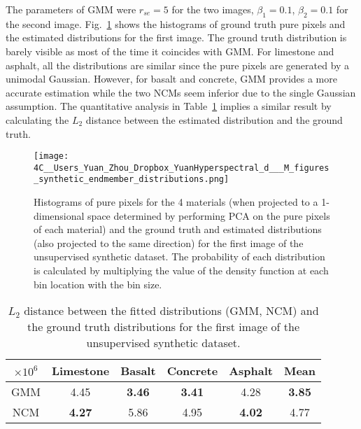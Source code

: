 \documentclass[twocolumn,english]{IEEEtran}
\providecommand{\tabularnewline}{\\}
\theoremstyle{plain}
\begin{document}
The parameters of GMM were $r_{se}=5$ for the two images, $\beta_{1}=0.1$,
$\beta_{2}=0.1$ for the second image. Fig.~\ref{fig:synthetic_histogram}
shows the histograms of ground truth pure pixels and the estimated
distributions for the first image. The ground truth distribution is
barely visible as most of the time it coincides with GMM. For limestone
and asphalt, all the distributions are similar since the pure pixels
are generated by a unimodal Gaussian. However, for basalt and concrete,
GMM provides a more accurate estimation while the two NCMs seem inferior
due to the single Gaussian assumption. The quantitative analysis in
Table~\ref{table:synthetic_dist_diff} implies a similar result by
calculating the $L_{2}$ distance between the estimated distribution
and the ground truth.

\begin{figure}
\begin{centering}
\texttt{[image: 4C\_\_Users\_Yuan\_Zhou\_Dropbox\_YuanHyperspectral\_d\_\_\_M\_figures\_synthetic\_endmember\_distributions.png]}
\par\end{centering}
\caption{Histograms of pure pixels for the 4 materials (when projected to a
1-dimensional space determined by performing PCA on the pure pixels
of each material) and the ground truth and estimated distributions
(also projected to the same direction) for the first image of the
unsupervised synthetic dataset. The probability of each distribution
is calculated by multiplying the value of the density function at
each bin location with the bin size.}

\label{fig:synthetic_histogram}
\end{figure}

\begin{table}
\caption{$L_{2}$ distance between the fitted distributions (GMM, NCM) and
the ground truth distributions for the first image of the unsupervised
synthetic dataset.}

\begin{centering}
\begin{tabular}{|c|c|c|c|c|c|}
\hline 
$\times10^{6}$ &
Limestone &
Basalt &
Concrete &
Asphalt &
Mean\tabularnewline
\hline 
\hline 
GMM &
4.45 &
\textbf{3.46} &
\textbf{3.41} &
4.28 &
\textbf{3.85}\tabularnewline
\hline 
NCM &
\textbf{4.27} &
5.86 &
4.95 &
\textbf{4.02} &
4.77\tabularnewline
\hline 
\end{tabular}
\par\end{centering}
\label{table:synthetic_dist_diff}
\end{table}
\end{document}
